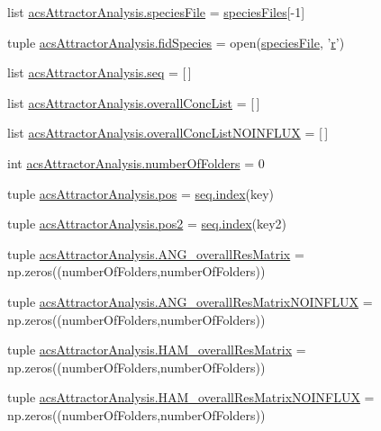 \begin{DoxyCompactItemize}
\item 
list \hyperlink{a00090_a0e036b776f4f724254115c2e284657eb}{acs\-Attractor\-Analysis.\-species\-File} = \hyperlink{a00022_af5703745c2c2a6af7f62da460994d9c2}{species\-Files}\mbox{[}-\/1\mbox{]}
\item 
tuple \hyperlink{a00090_a604c9f75892d8d8aeac8306c94630a23}{acs\-Attractor\-Analysis.\-fid\-Species} = open(\hyperlink{a00021_a7da0c82834970c5f3c3d9224ab832577}{species\-File}, '\hyperlink{a00025_ac862e7284527eb913b1351c8bfb8e079}{r}')
\item 
list \hyperlink{a00090_a33bc0e3fc99bab3df33d3f1626a19528}{acs\-Attractor\-Analysis.\-seq} = \mbox{[}$\,$\mbox{]}
\item 
list \hyperlink{a00090_aca1d14f4dbff06c02b0e3e362c7ffe14}{acs\-Attractor\-Analysis.\-overall\-Conc\-List} = \mbox{[}$\,$\mbox{]}
\item 
list \hyperlink{a00090_a62444c9b0d66deb07c2e1091695e7561}{acs\-Attractor\-Analysis.\-overall\-Conc\-List\-N\-O\-I\-N\-F\-L\-U\-X} = \mbox{[}$\,$\mbox{]}
\item 
int \hyperlink{a00090_aa5d2495d08b8ad5ebf34f85d5417e93c}{acs\-Attractor\-Analysis.\-number\-Of\-Folders} = 0
\item 
tuple \hyperlink{a00090_abae060beb170fe923fc10b75f9e82079}{acs\-Attractor\-Analysis.\-pos} = \hyperlink{a00054_a0cd6a44ffb07342cbc7e5ac33bfc9495}{seq.\-index}(key)
\item 
tuple \hyperlink{a00090_a6ab79d8205f5d0ae2da47fb0af93149a}{acs\-Attractor\-Analysis.\-pos2} = \hyperlink{a00054_a0cd6a44ffb07342cbc7e5ac33bfc9495}{seq.\-index}(key2)
\item 
tuple \hyperlink{a00090_a43a783e7bdb1094aa477c438bd67259f}{acs\-Attractor\-Analysis.\-A\-N\-G\-\_\-overall\-Res\-Matrix} = np.\-zeros((number\-Of\-Folders,number\-Of\-Folders))
\item 
tuple \hyperlink{a00090_a0d0e0ed8583e4aa041fa6c122324311e}{acs\-Attractor\-Analysis.\-A\-N\-G\-\_\-overall\-Res\-Matrix\-N\-O\-I\-N\-F\-L\-U\-X} = np.\-zeros((number\-Of\-Folders,number\-Of\-Folders))
\item 
tuple \hyperlink{a00090_a46dc8cdfb545b64952370e51ff02336f}{acs\-Attractor\-Analysis.\-H\-A\-M\-\_\-overall\-Res\-Matrix} = np.\-zeros((number\-Of\-Folders,number\-Of\-Folders))
\item 
tuple \hyperlink{a00090_a9aa1adb46370d97e4f38e7f09eb7a97c}{acs\-Attractor\-Analysis.\-H\-A\-M\-\_\-overall\-Res\-Matrix\-N\-O\-I\-N\-F\-L\-U\-X} = np.\-zeros((number\-Of\-Folders,number\-Of\-Folders))
\item 

\end{DoxyCompactItemize}
